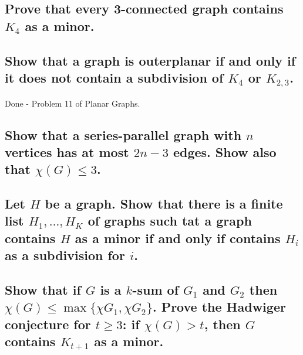 \subsection[Minors 1 - 1]{Prove that every 3-connected graph contains $K_4$ as a minor.}

\subsection[Minors 1 - 2]{Show that a graph is outerplanar if and only if it does not contain a subdivision of $K_4$ or $K_{2,3}$.}

Done - Problem 11 of Planar Graphs.

\subsection[Minors 1 - 3]{Show that a series-parallel graph with $n$ vertices has at most $2n -3$ edges. Show also that $\chi(G) \leq 3$.}

\subsection[Minors 1 - 5]{Let $H$ be a graph. Show that there is a finite list $H_1, \dots, H_K$ of graphs such tat a graph contains $H$ as a minor if and only if contains $H_i$ as a subdivision for $i$.}

\subsection[Minors 1 - 6]{Show that if $G$ is a $k$-sum of $G_1$ and $G_2$ then $\chi(G) \leq \max\{\chi{G_1}, \chi{G_2}\}$. Prove the Hadwiger conjecture for $t \geq 3$: if $\chi(G) > t$, then $G$ contains $K_{t+1}$ as a minor.}
